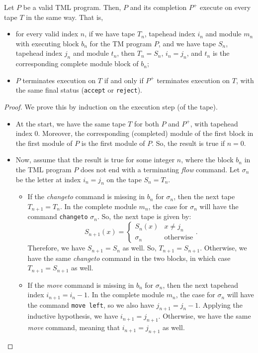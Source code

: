 \begin{appendices}
\begin{theorem} \label{thm:complete_TM}
    Let $P$ be a valid TML program. Then, $P$ and its completion $P^+$ execute on every tape $T$ in the same way. That is,
    \begin{itemize}
        \item for every valid index $n$, if we have tape $T_n$, tapehead index $i_n$ and module $m_n$ with executing block $b_n$ for the TM program $P$, and we have tape $S_n$, tapehead index $j_n$ and module $t_n$, then $T_n = S_n$, $i_n = j_n$, and $t_n$ is the corresponding complete module block of $b_n$;
        \item $P$ terminates execution on $T$ if and only if $P^+$ terminates execution on $T$, with the same final status (\texttt{accept} or \texttt{reject}).
    \end{itemize}
\end{theorem}
\begin{proof}
    We prove this by induction on the execution step (of the tape). 
    \begin{itemize}
        \item At the start, we have the same tape $T$ for both $P$ and $P^+$, with tapehead index 0. Moreover, the corresponding (completed) module of the first block in the first module of $P$ is the first module of $P$. So, the result is true if $n = 0$. 
        \item Now, assume that the result is true for some integer $n$, where the block $b_n$ in the TML program $P$ does not end with a terminating \textit{flow} command. Let $\sigma_n$ be the letter at index $i_n = j_n$ on the tape $S_n = T_n$.
        \begin{itemize}
            \item If the \textit{changeto} command is missing in $b_n$ for $\sigma_n$, then the next tape $T_{n+1} = T_n$. In the complete module $m_n$, the case for $\sigma_n$ will have the command \texttt{changeto} $\sigma_n$. So, the next tape is given by:
            \[S_{n+1}(x) = \begin{cases}
                S_n(x) & x \neq j_n \\
                \sigma_n & \text{otherwise}
            \end{cases}.\]
            Therefore, we have $S_{n+1} = S_n$ as well. So, $T_{n+1} = S_{n+1}$. Otherwise, we have the same \textit{changeto} command in the two blocks, in which case $T_{n+1} = S_{n+1}$ as well.
            
            \item If the \textit{move} command is missing in $b_n$ for $\sigma_n$, then the next tapehead index $i_{n+1} = i_n - 1$. In the complete module $m_n$, the case for $\sigma_n$ will have the command \texttt{move left}, so we also have $j_{n+1} = j_n - 1$. Applying the inductive hypothesis, we have $i_{n+1} = j_{n+1}$. Otherwise, we have the same \textit{move} command, meaning that $i_{n+1} = j_{n+1}$ as well.
            

\end{itemize}
\end{itemize}
\end{proof}
\end{appendices}
